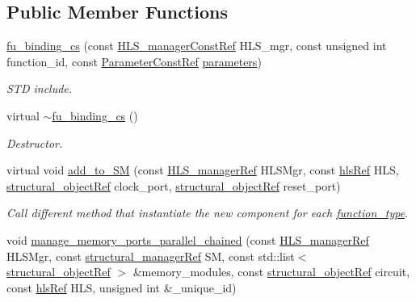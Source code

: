 \subsection*{Public Member Functions}
\begin{DoxyCompactItemize}
\item 
\hyperlink{classfu__binding__cs_a04aee22f90e1439e091d9e8f4251cae1}{fu\+\_\+binding\+\_\+cs} (const \hyperlink{hls__manager_8hpp_a1b481383e3beabc89bd7562ae672dd8c}{H\+L\+S\+\_\+manager\+Const\+Ref} H\+L\+S\+\_\+mgr, const unsigned int function\+\_\+id, const \hyperlink{Parameter_8hpp_a37841774a6fcb479b597fdf8955eb4ea}{Parameter\+Const\+Ref} \hyperlink{classfu__binding_aa372286fd7ddc5ce6424afba333bb80a}{parameters})
\begin{DoxyCompactList}\small\item\em S\+TD include. \end{DoxyCompactList}\item 
virtual \hyperlink{classfu__binding__cs_ae02202ffc124e2e628be4771b20e6a3f}{$\sim$fu\+\_\+binding\+\_\+cs} ()
\begin{DoxyCompactList}\small\item\em Destructor. \end{DoxyCompactList}\item 
virtual void \hyperlink{classfu__binding__cs_a60affd4760275bc386a0bdc05400dc6b}{add\+\_\+to\+\_\+\+SM} (const \hyperlink{hls__manager_8hpp_acd3842b8589fe52c08fc0b2fcc813bfe}{H\+L\+S\+\_\+manager\+Ref} H\+L\+S\+Mgr, const \hyperlink{hls_8hpp_a75d0c73923d0ddfa28c4843a802c73a7}{hls\+Ref} H\+LS, \hyperlink{structural__objects_8hpp_a8ea5f8cc50ab8f4c31e2751074ff60b2}{structural\+\_\+object\+Ref} clock\+\_\+port, \hyperlink{structural__objects_8hpp_a8ea5f8cc50ab8f4c31e2751074ff60b2}{structural\+\_\+object\+Ref} reset\+\_\+port)
\begin{DoxyCompactList}\small\item\em Call different method that instantiate the new component for each \hyperlink{structfunction__type}{function\+\_\+type}. \end{DoxyCompactList}\item 
void \hyperlink{classfu__binding__cs_a11b4e8a8b74e18bf3c73c2c535471270}{manage\+\_\+memory\+\_\+ports\+\_\+parallel\+\_\+chained} (const \hyperlink{hls__manager_8hpp_acd3842b8589fe52c08fc0b2fcc813bfe}{H\+L\+S\+\_\+manager\+Ref} H\+L\+S\+Mgr, const \hyperlink{structural__manager_8hpp_ab3136f0e785d8535f8d252a7b53db5b5}{structural\+\_\+manager\+Ref} SM, const std\+::list$<$ \hyperlink{structural__objects_8hpp_a8ea5f8cc50ab8f4c31e2751074ff60b2}{structural\+\_\+object\+Ref} $>$ \&memory\+\_\+modules, const \hyperlink{structural__objects_8hpp_a8ea5f8cc50ab8f4c31e2751074ff60b2}{structural\+\_\+object\+Ref} circuit, const \hyperlink{hls_8hpp_a75d0c73923d0ddfa28c4843a802c73a7}{hls\+Ref} H\+LS, unsigned int \&\+\_\+unique\+\_\+id)

\end{DoxyCompactItemize}
